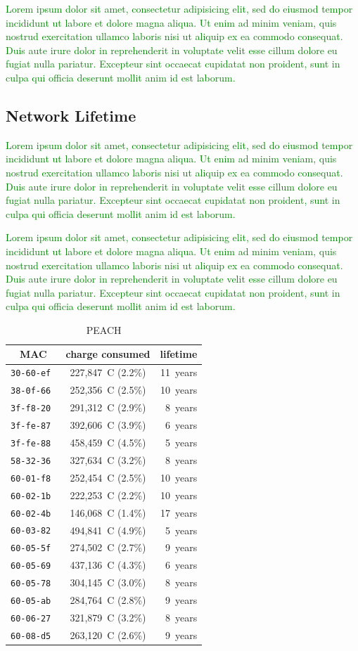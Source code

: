 \documentclass{elsarticle}
\newcommand{\lorem}          {\textcolor{green}{Lorem ipsum dolor sit amet, consectetur adipisicing elit, sed do eiusmod tempor incididunt ut labore et dolore magna aliqua. Ut enim ad minim veniam, quis nostrud exercitation ullamco laboris nisi ut aliquip ex ea commodo consequat. Duis aute irure dolor in reprehenderit in voluptate velit esse cillum dolore eu fugiat nulla pariatur. Excepteur sint occaecat cupidatat non proident, sunt in culpa qui officia deserunt mollit anim id est laborum.}}
\begin{document}
\lorem

\subsection{Network Lifetime}
\label{sec:lifetime}


\lorem


\lorem

\begin{table}
\begin{subtable}{.4\textwidth}
    \begin{tabular}{|c|c|r|}
        \toprule
        MAC    & charge consumed           &   lifetime \\
        \midrule
        \tt{30-60-ef}  & 227,847~C (2.2\%) & 11~years \\
        \tt{38-0f-66}  & 252,356~C (2.5\%) & 10~years \\
        \tt{3f-f8-20}  & 291,312~C (2.9\%) & 8~years \\
        \tt{3f-fe-87}  & 392,606~C (3.9\%) & 6~years \\
        \tt{3f-fe-88}  & 458,459~C (4.5\%) & 5~years \\
        \tt{58-32-36}  & 327,634~C (3.2\%) & 8~years \\
        \tt{60-01-f8}  & 252,454~C (2.5\%) & 10~years \\
        \tt{60-02-1b}  & 222,253~C (2.2\%) & 10~years \\
        \tt{60-02-4b}  & 146,068~C (1.4\%) & 17~years \\
        \tt{60-03-82}  & 494,841~C (4.9\%) & 5~years \\
        \tt{60-05-5f}  & 274,502~C (2.7\%) & 9~years \\
        \tt{60-05-69}  & 437,136~C (4.3\%) & 6~years \\
        \tt{60-05-78}  & 304,145~C (3.0\%) & 8~years \\
        \tt{60-05-ab}  & 284,764~C (2.8\%) & 9~years \\
        \tt{60-06-27}  & 321,879~C (3.2\%) & 8~years \\
        \tt{60-08-d5}  & 263,120~C (2.6\%) & 9~years \\
        \bottomrule
    \end{tabular}
    \caption{PEACH}
\end{subtable}\hfill

\end{table}
\end{document}
